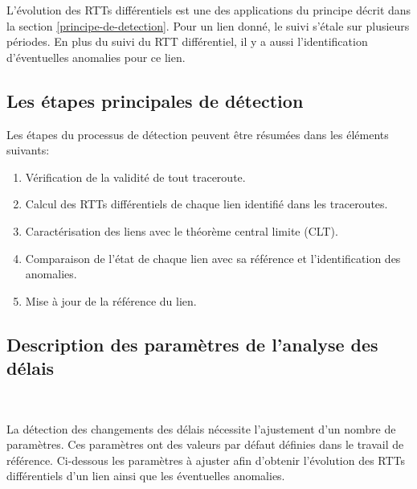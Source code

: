 L'évolution des RTTs différentiels est une des applications du principe décrit dans la section  \ref{principe-de-detection}. Pour un lien donné, le suivi s'étale sur plusieurs  périodes. En plus du suivi du RTT différentiel, il y a aussi l'identification d'éventuelles anomalies pour ce lien.


\subsection{Les étapes principales de détection} \label{steps:detection}
Les étapes du processus de détection peuvent être résumées dans les éléments suivants:

\begin{enumerate}[label=(\roman*)]
	
	\item Vérification de la validité de tout traceroute.
	
	\item Calcul des RTTs différentiels de chaque lien identifié dans les traceroutes.

	\item Caractérisation des liens avec le théorème central limite (CLT).
	
	\item  Comparaison de l'état de chaque lien avec sa référence  et l'identification des anomalies.

	\item Mise à jour de la référence du lien.
\end{enumerate}
\subsection{Description des paramètres de l'analyse des délais} \label{par:parametre-de-lanalyse}~

La détection des changements des délais nécessite l'ajustement d'un nombre de paramètres. Ces paramètres ont des valeurs par défaut définies dans le travail de référence. 
Ci-dessous les paramètres à ajuster afin d'obtenir l'évolution des RTTs différentiels d'un lien ainsi que les éventuelles anomalies.  

